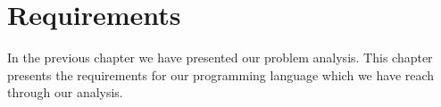 \chapter{Requirements}
\label{chap:requirements}
In the previous chapter we have presented our problem analysis. This chapter presents the requirements for our programming language which we have reach through our analysis.

